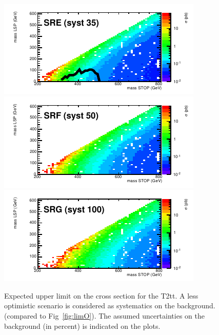 \begin{figure}[hbt]
\begin{center}
        \includegraphics[width=0.5\linewidth]{plots/stopPlot/masses_SRE_xsecP.pdf}%
        \includegraphics[width=0.5\linewidth]{plots/stopPlot/masses_SRF_xsecP.pdf}
        \includegraphics[width=0.5\linewidth]{plots/stopPlot/masses_SRG_xsecP.pdf}%
    \caption{Expected upper limit on the cross section for the
      T2tt. A less optimistic scenario is considered as systematics on the
      background. (compared to Fig~\ref{fig:limO}).
The assumed uncertainties on the background (in percent) is indicated on the plots.}
\label{fig:limP}
      \end{center}
\end{figure}

\clearpage
